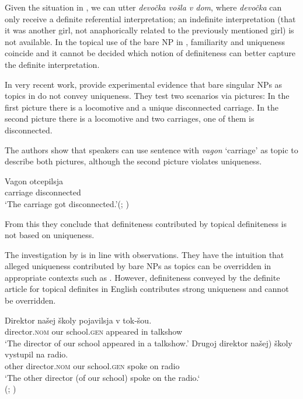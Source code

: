 \documentclass[output=paper]{langscibook}
\begin{document}
\noindent Given the situation in , we can utter \textit{devočka vošla v dom}, where \textit{devočka} can only receive a definite referential interpretation; an indefinite interpretation (that it was another girl, not anaphorically related to the previously mentioned girl) is not available. In the topical use of the bare NP in , familiarity and uniqueness coincide and it cannot be decided which notion of definiteness can better capture the definite interpretation.

In very recent work, \citet{Simik.Demian2020} provide experimental evidence that bare singular NPs as topics in  do not convey uniqueness. They test two scenarios via pictures: In the first picture there is a locomotive and a unique disconnected carriage. In the second picture there is a locomotive and two carriages, one of them is disconnected.

The authors show that  speakers can use sentence  with \textit{vagon} `carriage' as topic to describe both pictures, although the second picture violates uniqueness.

\ea \label{ex:10}
\gll Vagon    otcepilsja \\
    carriage  disconnected\\
\glt `The carriage got disconnected.'\hfill (; \citealt[15]{Simik.Demian2020})
\z

\noindent From this they conclude that definiteness contributed by topical definiteness is not based on uniqueness.

The investigation by  is in line with  observations. They have the intuition that alleged uniqueness contributed by bare NPs as topics can be overridden in appropriate contexts such as . However, definiteness conveyed by the definite article for topical definites in English contributes strong uniqueness and cannot be overridden.

\ea \label{ex:11}
\ea
\gll Direktor našej školy pojavilsja v tok-šou. \\
    director.\textsc{nom} our school.\textsc{gen} appeared in talkshow\\
\glt `The director of our school appeared in a talkshow.'
\ex
\gll Drugoj direktor \minsp{(} našej) školy vystupil na radio. \\
 other director.\textsc{nom} {} our school.\textsc{gen} spoke on radio\\
\glt  `The other director (of our school) spoke on the radio.`\\
\glt \hfill (; )
\z\z
\end{document}
